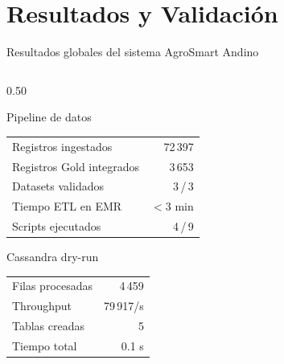 \documentclass[14pt,aspectratio=169]{beamer}
\begin{document}
\section{Resultados y Validaci\'on}

\begin{frame}{Resultados globales del sistema AgroSmart Andino}
  \begin{columns}[T]
    \begin{column}{0.50\textwidth}
      \begin{block}{Pipeline de datos}
        \vspace{0.2em}
        \begin{tabular}{lr}
          Registros ingestados & 72\,397 \\
          Registros Gold integrados & 3\,653 \\
          Datasets validados & 3\,/\,3 \\
          Tiempo ETL en EMR & $<$3 min \\
          Scripts ejecutados & 4\,/\,9 \\
        \end{tabular}
        \vspace{0.2em}
      \end{block}
      \vspace{0.3em}
      \begin{block}{Cassandra dry-run}
        \vspace{0.2em}
        \begin{tabular}{lr}
          Filas procesadas & 4\,459 \\
          Throughput & 79\,917/s \\
          Tablas creadas & 5 \\
          Tiempo total & 0.1 s \\
        \end{tabular}
        \vspace{0.2em}
      \end{block}
    \end{column}


\end{columns}
\end{frame}
\end{document}
